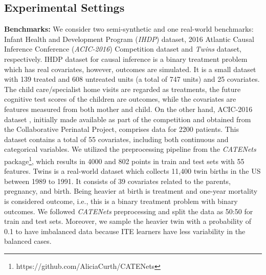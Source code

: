 \documentclass{article}
\begin{document}
\subsection{Experimental Settings}
\label{subsec_exp_settings}
\textbf{Benchmarks:} We consider two semi-synthetic and one real-world benchmarks: Infant Health and Development Program (\textit{IHDP}) dataset, 2016 Atlantic Causal Inference Conference (\textit{ACIC-2016}) Competition dataset and \textit{Twins} dataset, respectively. IHDP dataset \cite{hill2011bayesian,shalit2017estimating} for causal inference is a binary treatment problem which has real covariates, however, outcomes are simulated. It is a small dataset with 139 treated and 608 untreated units (a total of 747 units) and 25 covariates. The child care/specialist home visits are regarded as treatments, the future cognitive test scores of the children are outcomes, while the covariates are features measured from both mother and child. On the other hand, ACIC-2016 dataset \cite{dorie2019automated}, initially made available as part of the competition and obtained from the Collaborative Perinatal Project, comprises data for 2200 patients. This dataset contains a total of 55 covariates, including both continuous and categorical variables. We utilized the preprocessing pipeline from the \textit{CATENets} package\footnote{https://github.com/AliciaCurth/CATENets}, which results in 4000 and 802 points in train and test sets with 55 features. Twins \cite{almond2005costs} is a real-world dataset which collects 11,400 twin births in the US between 1989 to 1991. It consists of 39 covariates related to the parents, pregnancy, and birth. Being heavier at birth is treatment and one-year mortality is considered outcome, i.e., this is a binary treatment problem with binary outcomes. We followed \textit{CATENets} preprocessing and split the data as 50:50 for train and test sets. Moreover, we sample the heavier twin with a probability of 0.1 to have imbalanced data because ITE learners have less variability in the balanced cases.
\end{document}
